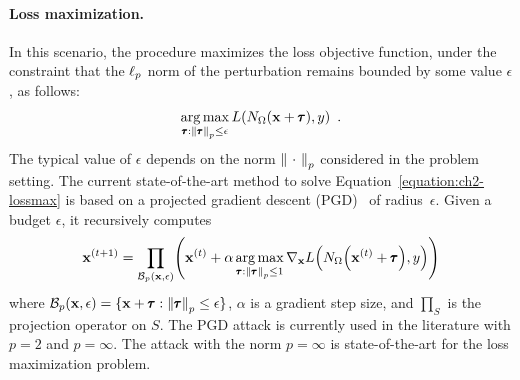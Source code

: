 \paragraph{Loss maximization.}
In this scenario, the procedure maximizes the loss objective function, under the constraint that the $\ell_p $ norm of the perturbation remains bounded by some value $\epsilon$, as follows:  
\begin{equation}
  \operatorname*{arg\,max}_{\pmb{\tau}:\norm{\pmb{\tau}}_p \leq \epsilon} L(N_\Omega(\mathbf{x} + \pmb{\tau}), y) \enspace.
  \label{equation:ch2-lossmax}
\end{equation}
The typical value of $\epsilon$ depends on the norm $\norm{\ \cdot\ }_p$ considered in the problem setting.
The current state-of-the-art method to solve Equation~\ref{equation:ch2-lossmax} is based on a projected gradient descent (PGD)~\cite{madry2018towards} of radius~$\epsilon$.
Given a budget $\epsilon$, it recursively computes
\begin{equation}
  \xvec^{(t+1)} = \prod_{\mathcal{B}_p(\xvec,\epsilon)}\left(\xvec^{(t)}
    + \alpha \argmax_{\adv: \norm{\adv}_p \leq 1} \nabla_\xvec L\left( \nn_\weights \left(\xvec^{(t)} + \adv \right), y \right)
\right)
  \label{equation:ch2-projectionPGD}
\end{equation}
where $\mathcal{B}_p(\mathbf{x},\epsilon) = \{ \mathbf{x} + \pmb{\tau}:\norm{\pmb{\tau}}_p \leq \epsilon\}$, $\alpha$ is a gradient step size, and $\prod_S$ is the projection operator on $S$.
The PGD attack is currently used in the literature with $p=2$ and $p=\infty$.
The attack with the norm $p=\infty$ is state-of-the-art for the loss maximization problem. 

